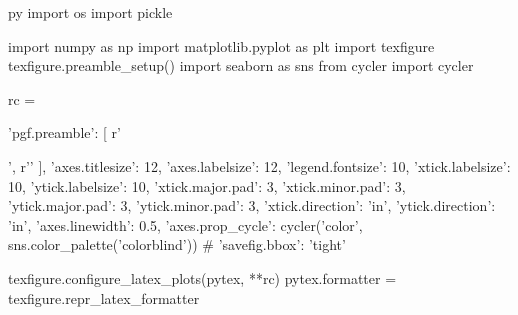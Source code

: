 \begin{pythontexcustomcode}{py}
import os
import pickle

import numpy as np
import matplotlib.pyplot as plt
import texfigure
texfigure.preamble_setup()
import seaborn as sns
from cycler import cycler

rc = {
    'pgf.preamble': [
        r'\usepackage{siunitx}',
        r'\newcommand*{\varv}{\upsilon}'
    ],
    'axes.titlesize': 12,
    'axes.labelsize': 12,
    'legend.fontsize': 10,
    'xtick.labelsize': 10,
    'ytick.labelsize': 10,
    'xtick.major.pad': 3,
    'xtick.minor.pad': 3,
    'ytick.major.pad': 3,
    'ytick.minor.pad': 3,
    'xtick.direction': 'in',
    'ytick.direction': 'in',
    'axes.linewidth': 0.5,
    'axes.prop_cycle': cycler('color', sns.color_palette('colorblind'))
# 'savefig.bbox': 'tight'
}
texfigure.configure_latex_plots(pytex, **rc)
pytex.formatter = texfigure.repr_latex_formatter
\end{pythontexcustomcode}
\begin{pycode}
\end{pycode}